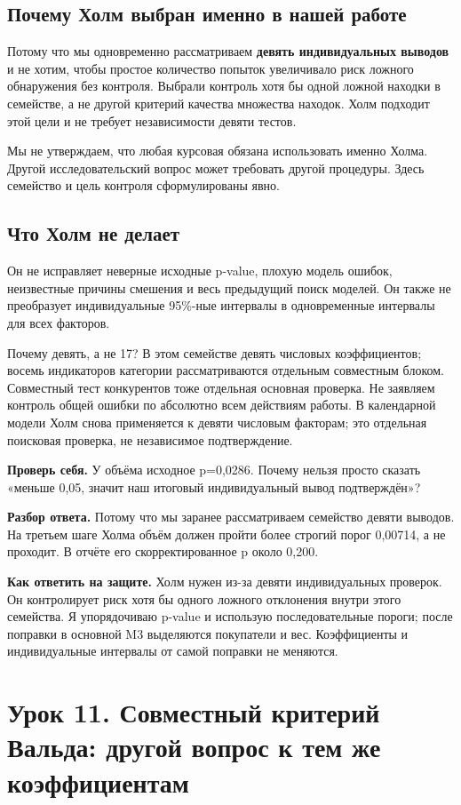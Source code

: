\documentclass[12pt,a4paper]{article}
\newcommand{\check}[2]{\par\textbf{Проверь себя.} #1\par\textbf{Разбор ответа.} #2\par}
\newcommand{\answer}[1]{\par\textbf{Как ответить на защите.} #1\par}
\begin{document}
\subsection{Почему Холм выбран именно в нашей работе}

Потому что мы одновременно рассматриваем \textbf{девять индивидуальных выводов} и не хотим, чтобы простое количество попыток увеличивало риск ложного обнаружения без контроля. Выбрали контроль хотя бы одной ложной находки в семействе, а не другой критерий качества множества находок. Холм подходит этой цели и не требует независимости девяти тестов.

Мы не утверждаем, что любая курсовая обязана использовать именно Холма. Другой исследовательский вопрос может требовать другой процедуры. Здесь семейство и цель контроля сформулированы явно.

\subsection{Что Холм не делает}

Он не исправляет неверные исходные p-value, плохую модель ошибок, неизвестные причины смешения и весь предыдущий поиск моделей. Он также не преобразует индивидуальные 95\%-ные интервалы в одновременные интервалы для всех факторов.

Почему девять, а не 17? В этом семействе девять числовых коэффициентов; восемь индикаторов категории рассматриваются отдельным совместным блоком. Совместный тест конкурентов тоже отдельная основная проверка. Не заявляем контроль общей ошибки по абсолютно всем действиям работы. В календарной модели Холм снова применяется к девяти числовым факторам; это отдельная поисковая проверка, не независимое подтверждение.

\check{У объёма исходное p=0,0286. Почему нельзя просто сказать «меньше 0,05, значит наш итоговый индивидуальный вывод подтверждён»?}{Потому что мы заранее рассматриваем семейство девяти выводов. На третьем шаге Холма объём должен пройти более строгий порог 0,00714, а не проходит. В отчёте его скорректированное p около 0,200.}

\answer{Холм нужен из-за девяти индивидуальных проверок. Он контролирует риск хотя бы одного ложного отклонения внутри этого семейства. Я упорядочиваю p-value и использую последовательные пороги; после поправки в основной M3 выделяются покупатели и вес. Коэффициенты и индивидуальные интервалы от самой поправки не меняются.}
\clearpage
\section{Урок 11. Совместный критерий Вальда: другой вопрос к тем же коэффициентам}
\end{document}
